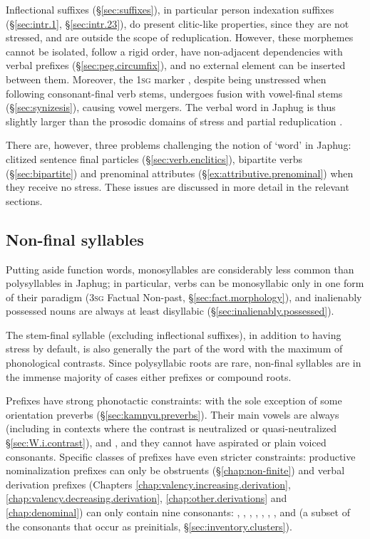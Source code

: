 Inflectional suffixes (§\ref{sec:suffixes}), in particular person indexation suffixes (§\ref{sec:intr.1}, §\ref{sec:intr.23}), do present clitic-like properties, since they are not stressed, and are outside the scope of reduplication. However, these morphemes cannot be isolated, follow a rigid order, have non-adjacent dependencies with verbal prefixes (§\ref{sec:peg.circumfix}), and no external element can be inserted between them. Moreover, the \textsc{1sg} marker , despite being unstressed when following consonant-final verb stems, undergoes fusion with vowel-final stems (§\ref{sec:synizesis}), causing vowel mergers. The verbal word in Japhug is thus slightly larger than the prosodic domains of stress and partial reduplication \citep{schiering10prosodic}.

There are, however, three problems challenging the notion of `word' in Japhug: clitized sentence final particles (§\ref{sec:verb.enclitics}), bipartite verbs (§\ref{sec:bipartite}) and  prenominal attributes (§\ref{ex:attributive.prenominal}) when they receive no stress. These issues are discussed in more detail in the relevant sections. 

\subsection{Non-final syllables} \label{sec:non.final.syllable}
Putting aside function words, monosyllables are considerably less common than polysyllables in Japhug; in particular, verbs can be monosyllabic only in one form of their paradigm (\textsc{3sg} Factual Non-past, §\ref{sec:fact.morphology}), and inalienably possessed nouns are always at least disyllabic (§\ref{sec:inalienably.possessed}).

The stem-final syllable (excluding inflectional suffixes), in addition to having stress by default, is also generally the part of the word with the maximum of phonological contrasts. Since polysyllabic roots are rare, non-final syllables are in the immense majority of cases either prefixes or compound roots.

Prefixes have strong phonotactic constraints: with the sole exception of some orientation preverbs (§\ref{sec:kamnyu.preverbs}). Their main vowels are always  (including  in contexts where the contrast is neutralized or quasi-neutralized §\ref{sec:W.i.contrast}),  and , and they cannot have aspirated or plain voiced consonants. Specific classes of prefixes have even stricter constraints: productive nominalization prefixes can only be obstruents (§\ref{chap:non-finite}) and  verbal derivation prefixes (Chapters \ref{chap:valency.increasing.derivation}, \ref{chap:valency.decreasing.derivation}, \ref{chap:other.derivations} and \ref{chap:denominal}) can only contain nine consonants: , , , ,  , ,  ,  and  (a subset of the consonants that occur as preinitials, §\ref{sec:inventory.clusters}).

